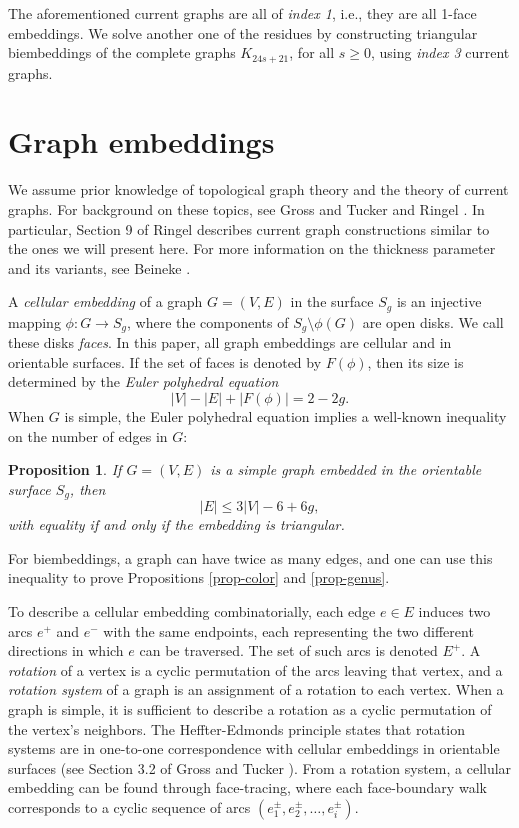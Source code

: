 \documentclass[12pt]{article}
\theoremstyle{plain}
\newtheorem{proposition}[theorem]{Proposition}
\begin{document}
The aforementioned current graphs are all of \emph{index 1}, i.e., they are all 1-face embeddings. We solve another one of the residues by constructing triangular biembeddings of the complete graphs $K_{24s+21}$, for all $s \geq 0$, using \emph{index 3} current graphs. 

\section{Graph embeddings}

We assume prior knowledge of topological graph theory and the theory of current graphs. For background on these topics, see Gross and Tucker \cite{GrossTucker} and Ringel \cite{Ringel-MapColor}. In particular, Section 9 of Ringel \cite{Ringel-MapColor} describes current graph constructions similar to the ones we will present here. For more information on the thickness parameter and its variants, see Beineke \cite{Beineke-Survey}. 

A \emph{cellular embedding} of a graph $G = (V,E)$ in the surface $S_g$ is an injective mapping $\phi\colon G \to S_g$, where the components of $S_g \setminus \phi(G)$ are open disks. We call these disks \emph{faces}. In this paper, all graph embeddings are cellular and in orientable surfaces. If the set of faces is denoted by $F(\phi)$, then its size is determined by the \emph{Euler polyhedral equation}
$$|V|-|E|+|F(\phi)| = 2-2g.$$ 
When $G$ is simple, the Euler polyhedral equation implies a well-known inequality on the number of edges in $G$:
\begin{proposition}
If $G = (V,E)$ is a simple graph embedded in the orientable surface $S_g$, then
$$|E| \leq 3|V|-6+6g,$$
with equality if and only if the embedding is triangular. 
\label{prop-singlebound}
\end{proposition}
For biembeddings, a graph can have twice as many edges, and one can use this inequality to prove Propositions \ref{prop-color} and \ref{prop-genus}. 

To describe a cellular embedding combinatorially, each edge $e \in E$ induces two arcs $e^+$ and $e^-$ with the same endpoints, each representing the two different directions in which $e$ can be traversed. The set of such arcs is denoted $E^+$. A \emph{rotation} of a vertex is a cyclic permutation of the arcs leaving that vertex, and a \emph{rotation system} of a graph is an assignment of a rotation to each vertex. When a graph is simple, it is sufficient to describe a rotation as a cyclic permutation of the vertex's neighbors. The Heffter-Edmonds principle states that rotation systems are in one-to-one correspondence with cellular embeddings in orientable surfaces (see Section 3.2 of Gross and Tucker \cite{GrossTucker}). From a rotation system, a cellular embedding can be found through face-tracing, where each face-boundary walk corresponds to a cyclic sequence of arcs $(e_1^\pm, e_2^\pm, \dotsc, e_i^\pm)$. 
\end{document}
